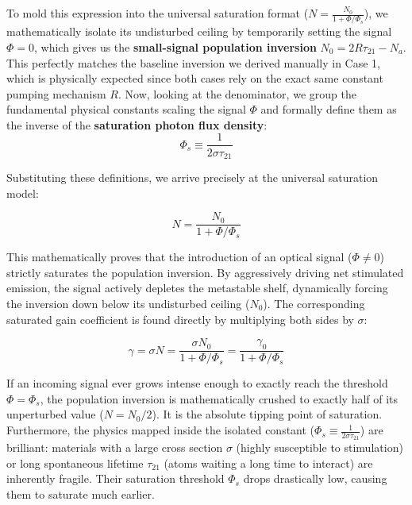 To mold this expression into the universal saturation format ($N = \frac{N_0}{1 + \Phi/\Phi_s}$), we mathematically isolate its undisturbed ceiling by temporarily setting the signal $\Phi = 0$, which gives us the \textbf{small-signal population inversion} $N_0 = 2R\tau_{21} - N_a$. This perfectly matches the baseline inversion we derived manually in Case 1, which is physically expected since both cases rely on the exact same constant pumping mechanism $R$. Now, looking at the denominator, we group the fundamental physical constants scaling the signal $\Phi$ and formally define them as the inverse of the \textbf{saturation photon flux density}:
\begin{equation*}
    \Phi_s \equiv \frac{1}{2\sigma\tau_{21}}
\end{equation*}

Substituting these definitions, we arrive precisely at the universal saturation model:
\begin{keyresult}
    \begin{equation}
        N = \frac{N_0}{1 + \Phi/\Phi_s}
    \end{equation}
\end{keyresult}

This mathematically proves that the introduction of an optical signal ($\Phi \neq 0$) strictly saturates the population inversion. By aggressively driving net stimulated emission, the signal actively depletes the metastable shelf, dynamically forcing the inversion down below its undisturbed ceiling ($N_0$). The corresponding saturated gain coefficient is found directly by multiplying both sides by $\sigma$:
\begin{keyresult}
    \begin{equation*}
        \gamma = \sigma N = \frac{\sigma N_0}{1 + \Phi/\Phi_s} = \frac{\gamma_0}{1 + \Phi/\Phi_s}
    \end{equation*}
\end{keyresult}

\begin{keyinsight}
    If an incoming signal ever grows intense enough to exactly reach the threshold $\Phi = \Phi_s$, the population inversion is mathematically crushed to exactly half of its unperturbed value ($N = N_0/2$). It is the absolute tipping point of saturation. Furthermore, the physics mapped inside the isolated constant ($\Phi_s \equiv \frac{1}{2\sigma\tau_{21}}$) are brilliant: materials with a large cross section $\sigma$ (highly susceptible to stimulation) or long spontaneous lifetime $\tau_{21}$ (atoms waiting a long time to interact) are inherently fragile. Their saturation threshold $\Phi_s$ drops drastically low, causing them to saturate much earlier.
\end{keyinsight}

